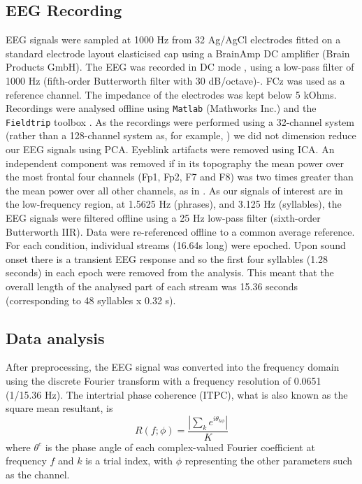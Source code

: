 \documentclass[10pt,letterpaper]{article}
\newcommand{\citet}[1]{\cite{#1}}
\begin{document}
\subsection*{EEG Recording}
 
EEG signals were sampled at 1000 Hz from 32 Ag/AgCl electrodes fitted
on a standard electrode layout elasticised cap using a BrainAmp DC
amplifier (Brain Products GmbH). The EEG was recorded in DC mode ,
using a low-pass filter of 1000 Hz (fifth-order Butterworth filter
with 30 dB/octave)-. FCz was used as a reference channel. The
impedance of the electrodes was kept below 5 kOhms. Recordings were
analysed offline using \texttt{Matlab} (Mathworks Inc.) and the
\texttt{Fieldtrip} toolbox \cite{FieldTrip}. As the recordings were
performed using a 32-channel system (rather than a 128-channel system
as, for example, \citet{DingEtAl2017}) we did not dimension reduce our
EEG signals using PCA. Eyeblink artifacts were removed using ICA. An
independent component was removed if in its topography the mean power
over the most frontal four channels (Fp1, Fp2, F7 and F8) was two
times greater than the mean power over all other channels, as in
\citet{DingEtAl2017}. As our signals of interest are in the
low-frequency region, at 1.5625 Hz (phrases), and 3.125 Hz
(syllables), the EEG signals were filtered offline using a 25 Hz
low-pass filter (sixth-order Butterworth IIR). Data were re-referenced
offline to a common average reference. For each condition, individual
streams (16.64s long) were epoched. Upon sound onset there is a
transient EEG response and so the first four syllables (1.28 seconds)
in each epoch were removed from the analysis. This meant that the
overall length of the analysed part of each stream was 15.36 seconds
(corresponding to 48 syllables x 0.32 s).

\subsection*{Data analysis}

After preprocessing, the EEG signal was converted into the frequency
domain using the discrete Fourier transform with a frequency
resolution of 0.0651 (1/15.36 Hz). The intertrial phase coherence
(ITPC), what is also known as the square mean resultant, is
\begin{equation}
\label{eq:itpc}
R(f;\phi)=\frac{\left|\sum_k e^{i\theta_{k\phi}}\right|}{K}
\end{equation}
where $\theta^c$ is the phase angle of each complex-valued Fourier
coefficient at frequency $f$ and $k$ is a trial index, with $\phi$
representing the other parameters such as the channel.
\end{document}
